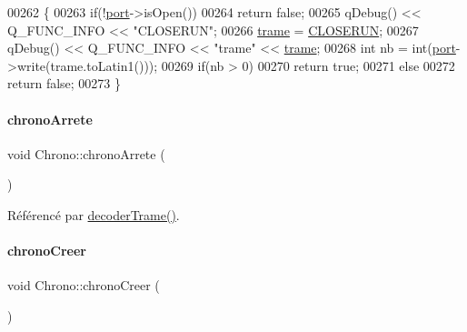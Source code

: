 \begin{DoxyCode}
00262 \{
00263     \textcolor{keywordflow}{if}(!\hyperlink{class_chrono_aca5fbe0eebd7f876f954d4a99c564167}{port}->isOpen())
00264         \textcolor{keywordflow}{return} \textcolor{keyword}{false};
00265     qDebug() << Q\_FUNC\_INFO << \textcolor{stringliteral}{"CLOSERUN"};
00266     \hyperlink{class_chrono_a26f2155aa6e5ef4296e5456b64a713b5}{trame} = \hyperlink{chrono_8h_aadc6271993e3725db8c6640289f8d2bb}{CLOSERUN};
00267     qDebug() << Q\_FUNC\_INFO << \textcolor{stringliteral}{"trame"} << \hyperlink{class_chrono_a26f2155aa6e5ef4296e5456b64a713b5}{trame};
00268     \textcolor{keywordtype}{int} nb = int(\hyperlink{class_chrono_aca5fbe0eebd7f876f954d4a99c564167}{port}->write(trame.toLatin1()));
00269     \textcolor{keywordflow}{if}(nb > 0)
00270         \textcolor{keywordflow}{return} \textcolor{keyword}{true};
00271     \textcolor{keywordflow}{else}
00272         \textcolor{keywordflow}{return} \textcolor{keyword}{false};
00273 \}
\end{DoxyCode}
\mbox{\label{class_chrono_a5e28dfd0010e34a19ccb03b9dcbe4dcd}} 
\paragraph{\texorpdfstring{chrono\+Arrete}{chronoArrete}}
{\footnotesize\ttfamily void Chrono\+::chrono\+Arrete (\begin{DoxyParamCaption}{ }\end{DoxyParamCaption})\hspace{0.3cm}{\ttfamily [signal]}}



Référencé par \hyperlink{class_chrono_a9a66b4e81385e2c354805548b94cdfb6}{decoder\+Trame()}.

\mbox{\label{class_chrono_a60ef5586dd429ab616c2b02c143daedf}} 
\paragraph{\texorpdfstring{chrono\+Creer}{chronoCreer}}
{\footnotesize\ttfamily void Chrono\+::chrono\+Creer (\begin{DoxyParamCaption}{ }\end{DoxyParamCaption})\hspace{0.3cm}{\ttfamily [signal]}}



